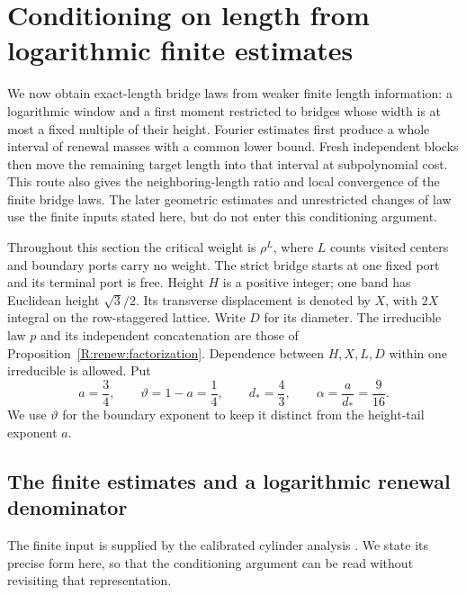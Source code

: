\section{Conditioning on length from logarithmic finite estimates}
\label{R:cal:section}

We now obtain exact-length bridge laws from weaker finite length
information: a logarithmic window and a first moment restricted to bridges
whose width is at most a fixed multiple of their height. Fourier estimates first produce a whole interval
of renewal masses with a common lower bound. Fresh independent blocks then
move the remaining target length into that interval at subpolynomial cost.
This route also gives the neighboring-length ratio and local convergence
of the finite bridge laws. The later geometric estimates and unrestricted
changes of law use the finite inputs stated here, but do not enter this
conditioning argument.

Throughout this section the critical weight is $\rho^L$, where $L$ counts
visited centers and boundary ports carry no weight. The strict bridge starts
at one fixed port and its terminal port is free. Height $H$ is a positive
integer; one band has Euclidean height $\sqrt3/2$. Its transverse displacement
is denoted by $X$, with $2X$ integral on the row-staggered lattice. Write $D$
for its diameter. The irreducible law $p$ and its independent concatenation
are those of Proposition~\ref{R:renew:factorization}. Dependence between $H,X,L,D$
within one irreducible is allowed. Put
\[
 a=\frac34,\qquad \vartheta=1-a=\frac14,\qquad
 d_* =\frac43,\qquad \alpha=\frac{a}{d_*}=\frac9{16}.
\]
We use $\vartheta$ for the boundary exponent to keep it distinct from the
height-tail exponent $a$.

\subsection{The finite estimates and a logarithmic renewal denominator}
\label{R:cal:conditioning}
The finite input is supplied by the calibrated cylinder analysis
\cite[Theorems~1.1--1.2 and Proposition~11.2]{compL}.
We state its precise form here, so that the conditioning argument can be
read without revisiting that representation.


